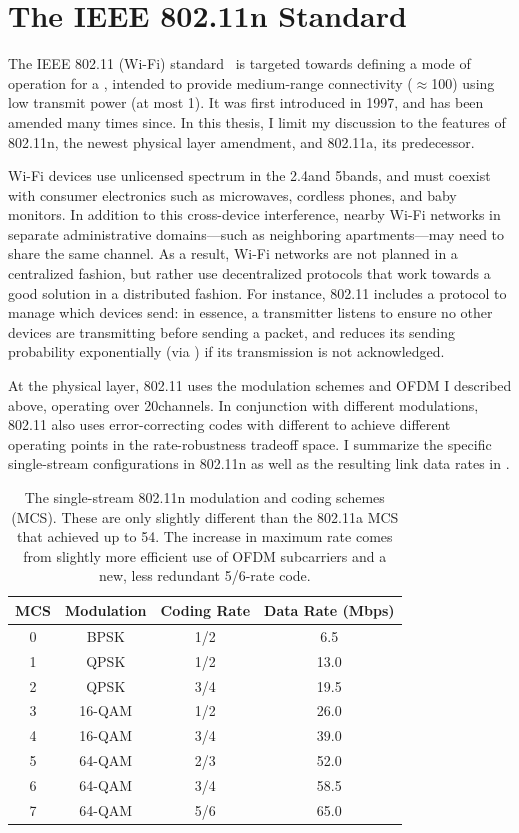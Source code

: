\section{The IEEE 802.11n Standard}
The IEEE 802.11 (Wi-Fi) standard~\cite{80211} is targeted towards defining a mode of operation for a , intended to provide medium-range connectivity ($\approx$100\m) using low transmit power (at most 1\W). It was first introduced in 1997, and has been amended many times since. In this thesis, I limit my discussion to the features of 802.11n, the newest physical layer amendment, and 802.11a, its predecessor.

Wi-Fi devices use unlicensed spectrum in the 2.4\GHz and 5\GHz bands, and must coexist with consumer electronics such as microwaves, cordless phones, and baby monitors. In addition to this cross-device interference, nearby Wi-Fi networks in separate administrative domains---such as neighboring apartments---may need to share the same channel. As a result, Wi-Fi networks are not planned in a centralized fashion, but rather use decentralized protocols that work towards a good solution in a distributed fashion. For instance, 802.11 includes a  protocol to manage which devices send: in essence, a transmitter listens to ensure no other devices are transmitting before sending a packet, and reduces its sending probability exponentially (via ) if its transmission is not acknowledged.

At the physical layer, 802.11 uses the modulation schemes and OFDM I described above, operating over 20\MHz channels. In conjunction with different modulations, 802.11 also uses error-correcting codes with different  to achieve different operating points in the rate-robustness tradeoff space. I summarize the specific single-stream configurations in 802.11n as well as the resulting link data rates in .

\begin{table}[t]
\centering
\begin{tabular}{cccc}
\toprule
MCS & Modulation & Coding Rate & Data Rate (Mbps) \\
\midrule
0 & BPSK & 1/2 & 6.5 \\
1 & QPSK & 1/2 & 13.0\\
2 & QPSK & 3/4 & 19.5\\
3 & 16-QAM & 1/2 & 26.0\\
4 & 16-QAM & 3/4 & 39.0\\
5 & 64-QAM & 2/3 & 52.0\\
6 & 64-QAM & 3/4 & 58.5\\
7 & 64-QAM & 5/6 & 65.0\\
\bottomrule
\end{tabular}
\caption[The 802.11n single-stream rates]{\label{tab:siso_mcs} The single-stream 802.11n modulation and coding schemes (MCS). These are only slightly different than the 802.11a MCS that achieved up to 54\Mbps. The increase in maximum rate comes from slightly more efficient use of OFDM subcarriers and a new, less redundant 5/6-rate code.}
\end{table}

